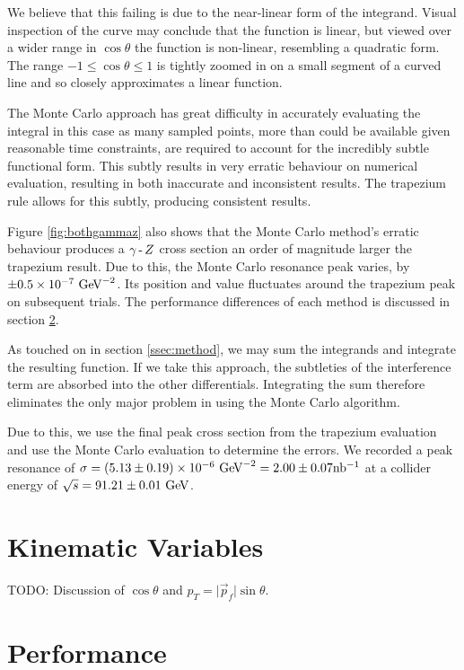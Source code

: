 \documentclass[]{article}
\providecommand{\e}[1]{\ensuremath{\times 10^{#1}}}
\begin{document}
We believe that this failing is due to the near-linear form of the integrand. Visual inspection of the curve may conclude that the function is linear, but viewed over a wider range in $\cos{\theta}$ the function is non-linear, resembling a quadratic form. The range $-1\leq\cos{\theta}\leq1$ is tightly zoomed in on a small segment of a curved line and so closely approximates a linear function.

The Monte Carlo approach has great difficulty in accurately evaluating the integral in this case as many sampled points, more than could be available given reasonable time constraints, are required to account for the incredibly subtle functional form. This subtly results in very erratic behaviour on numerical evaluation, resulting in both inaccurate and inconsistent results. The trapezium rule allows for this subtly, producing consistent results.

Figure \ref{fig:bothgammaz} also shows that the Monte Carlo method's erratic behaviour produces a $\gamma\operatorname{-}Z $ cross section an order of magnitude larger the trapezium result. Due to this, the Monte Carlo resonance peak varies, by $\pm0.5\e{-7}\GeV^{-2}$. Its position and value fluctuates around the trapezium peak on subsequent trials. The performance differences of each method is discussed in section \ref{sec:performance}.

As touched on in section \ref{ssec:method}, we may sum the integrands and integrate the resulting function. If we take this approach, the subtleties of the interference term are absorbed into the other differentials. Integrating the sum therefore eliminates the only major problem in using the Monte Carlo algorithm.

Due to this, we use the final peak cross section from the trapezium evaluation and use the Monte Carlo evaluation to determine the errors. We recorded a peak resonance of $\sigma=(5.13\pm0.19)\e{-6}\GeV^{-2}=2.00\pm0.07\inb$ at a collider energy of $\sqrt{s}=91.21\pm0.01\GeV$.


\section{Kinematic Variables}\label{sec:variables}

TODO: Discussion of $\cos{\theta}$ and $p_{T} = \lvert\vec{p}_{f}\rvert\sin{\theta}$.


\section{Performance}\label{sec:performance}
\end{document}
